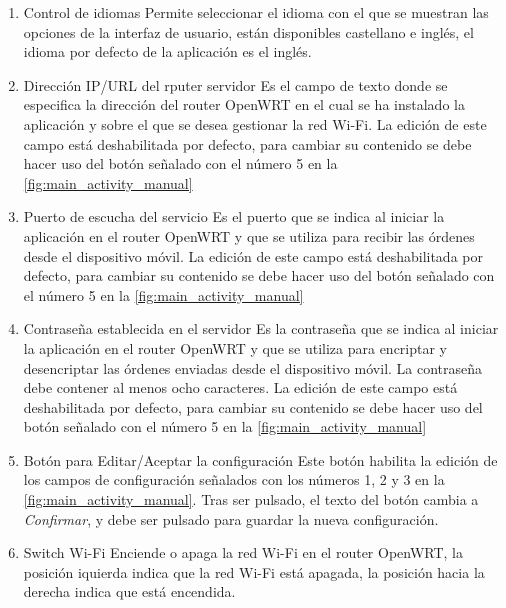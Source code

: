 \documentclass[12pt]{article}
\begin{document}
        \begin{enumerate}

            \item Control de idiomas
            Permite seleccionar el idioma con el que se muestran las opciones de la interfaz de usuario, están disponibles castellano e inglés, el idioma por defecto de la aplicación es el inglés.

            \item Dirección IP/URL del rputer servidor
            Es el campo de texto donde se especifica la dirección del router OpenWRT en el cual se ha instalado la aplicación y sobre el que se desea gestionar la red Wi-Fi. La edición de este campo está deshabilitada por defecto, para cambiar su contenido se debe hacer uso del botón señalado con el número 5 en la \ref{fig:main_activity_manual}

            \item Puerto de escucha del servicio
            Es el puerto que se indica al iniciar la aplicación en el router OpenWRT y que se utiliza para recibir las órdenes desde el dispositivo móvil. La edición de este campo está deshabilitada por defecto, para cambiar su contenido se debe hacer uso del botón señalado con el número 5 en la \ref{fig:main_activity_manual}

            \item Contraseña establecida en el servidor
            Es la contraseña que se indica al iniciar la aplicación en el router OpenWRT y que se utiliza para encriptar y desencriptar las órdenes enviadas desde el dispositivo móvil. La contraseña debe contener al menos ocho caracteres. La edición de este campo está deshabilitada por defecto, para cambiar su contenido se debe hacer uso del botón señalado con el número 5 en la \ref{fig:main_activity_manual}

            \item Botón para Editar/Aceptar la configuración
            Este botón habilita la edición de los campos de configuración señalados con los números 1, 2 y 3 en la \ref{fig:main_activity_manual}. Tras ser pulsado, el texto del botón cambia a \textit{Confirmar}, y debe ser pulsado para guardar la nueva configuración.

            \item Switch Wi-Fi
            Enciende o apaga la red Wi-Fi en el router OpenWRT, la posición iquierda indica que la red Wi-Fi está apagada, la posición hacia la derecha indica que está encendida.


\end{enumerate}
\end{document}
